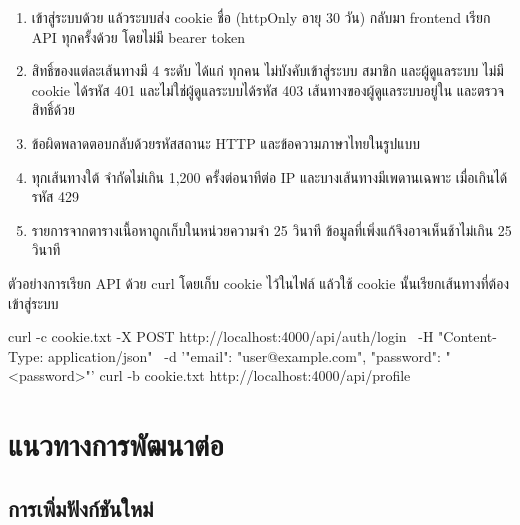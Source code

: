 \begin{enumerate}
\item เข้าสู่ระบบด้วย  แล้วระบบส่ง cookie ชื่อ  (httpOnly อายุ 30 วัน) กลับมา frontend เรียก API ทุกครั้งด้วย  โดยไม่มี bearer token
\item สิทธิ์ของแต่ละเส้นทางมี 4 ระดับ ได้แก่ ทุกคน ไม่บังคับเข้าสู่ระบบ สมาชิก และผู้ดูแลระบบ ไม่มี cookie ได้รหัส 401 และไม่ใช่ผู้ดูแลระบบได้รหัส 403 เส้นทางของผู้ดูแลระบบอยู่ใน  และตรวจสิทธิ์ด้วย 
\item ข้อผิดพลาดตอบกลับด้วยรหัสสถานะ HTTP และข้อความภาษาไทยในรูปแบบ 
\item ทุกเส้นทางใต้  จำกัดไม่เกิน 1,200 ครั้งต่อนาทีต่อ IP และบางเส้นทางมีเพดานเฉพาะ เมื่อเกินได้รหัส 429
\item รายการจากตารางเนื้อหาถูกเก็บในหน่วยความจำ 25 วินาที ข้อมูลที่เพิ่งแก้จึงอาจเห็นช้าไม่เกิน 25 วินาที
\end{enumerate}

ตัวอย่างการเรียก API ด้วย curl โดยเก็บ cookie ไว้ในไฟล์ แล้วใช้ cookie นั้นเรียกเส้นทางที่ต้องเข้าสู่ระบบ

\begin{terminal}
curl -c cookie.txt -X POST http://localhost:4000/api/auth/login \
  -H "Content-Type: application/json" \
  -d '{"email": "user@example.com", "password": "<password>"}'
curl -b cookie.txt http://localhost:4000/api/profile
\end{terminal}

\section{แนวทางการพัฒนาต่อ}

\subsection{การเพิ่มฟังก์ชันใหม่}

